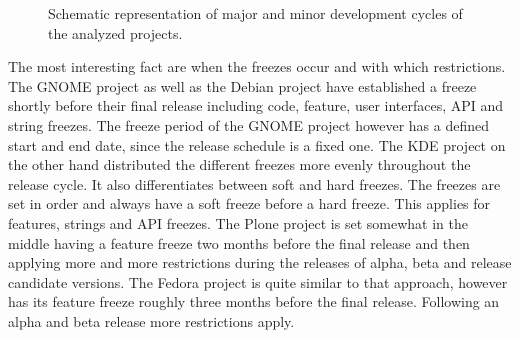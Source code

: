 \begin{figure}[htbp]
  \centering
  \noindent{}

  \noindent{}

  \noindent{}

  \noindent{}

  \noindent{}
  \caption[Representation of Development Cycles]
  {Schematic representation of major and minor development cycles of the
    analyzed projects.}
\end{figure}

The most interesting fact are when the freezes occur and with which
restrictions. The GNOME project as well as the Debian project have established
a freeze shortly before their final release including code, feature, user
interfaces, \ac{API} and string freezes. The freeze period of the GNOME project
however has a defined start and end date, since the release schedule is a fixed
one. The KDE project on the other hand distributed the different freezes more
evenly throughout the release cycle. It also differentiates between soft and
hard freezes. The freezes are set in order and always have a soft freeze before
a hard freeze. This applies for features, strings and \ac{API} freezes. The
Plone project is set somewhat in the middle having a feature freeze two months
before the final release and then applying more and more restrictions during
the releases of alpha, beta and release candidate versions. The Fedora project
is quite similar to that approach, however has its feature freeze roughly three
months before the final release. Following an alpha and beta release more
restrictions apply.

